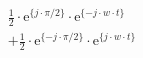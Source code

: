 \correct
\begin{align*}
  \frac{1}{2} \cdot \textrm{e}^{\{ j \cdot \pi/2 \}} \cdot \textrm{e}^{\{-j \cdot w \cdot t \}} \\
+ \frac{1}{2} \cdot \textrm{e}^{\{-j \cdot \pi/2 \}} \cdot \textrm{e}^{\{ j \cdot w \cdot t \}}
\end{align*}
